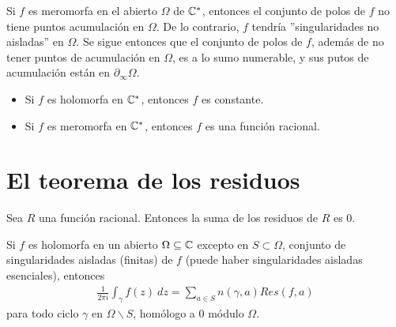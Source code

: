 \begin{obs}
    Si $f$ es meromorfa en el abierto $\Omega$ de $\mathbb{C}^*$, entonces el conjunto de polos de $f$ no tiene puntos acumulación en $\Omega$. De lo contrario, $f$ tendría ''singularidades no aisladas'' en $\Omega$. Se sigue entonces que el conjunto de polos de $f$, además de no tener puntos de acumulación en $\Omega$, es a lo sumo numerable, y sus putos de acumulación están en $\partial_{\infty} \Omega$.
\end{obs}

\begin{teo}
    \begin{itemize}
        \item Si $f$ es holomorfa en $\mathbb{C}^*$, entonces $f$ es constante.
        \item Si $f$ es meromorfa en $\mathbb{C}^*$, entonces $f$ es una función racional.
    \end{itemize}
\end{teo}

\section{El teorema de los residuos}

\begin{prop}
    Sea $R$ una función racional. Entonces la suma de los residuos de $R$ es $0$.
\end{prop}

\begin{teo}
    Si $f$ es holomorfa en un abierto $\Omega \subseteq \mathbb{C}$ excepto en $S \subset \Omega$, conjunto de singularidades aisladas (finitas) de $f$ (puede haber singularidades aisladas esenciales), entonces
    \begin{align*}
        \frac{1}{2\pi i}\int_{\gamma}{f(z) \ dz} = \sum_{a \in S}{n(\gamma,a)Res(f,a)}
    \end{align*}
    para todo ciclo $\gamma$ en $\Omega \backslash S$, homólogo a 0 módulo $\Omega$.
\end{teo}

